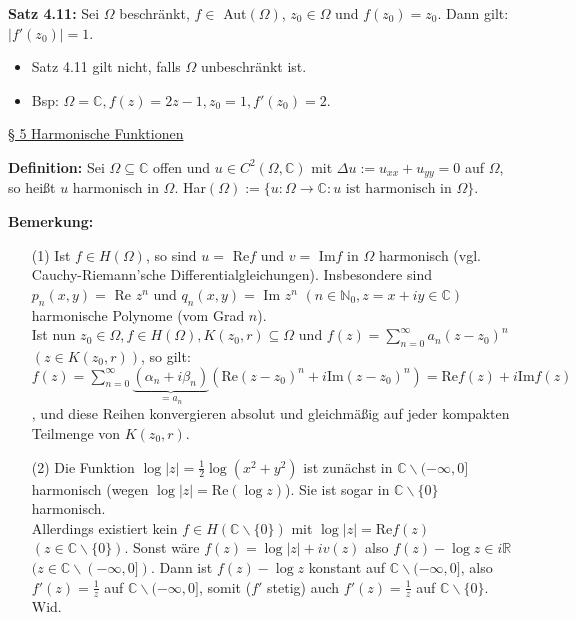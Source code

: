 \documentclass[11pt]{article}
\newcommand{\C}{\mathbb{C}}
\newcommand{\R}{\mathbb{R}}
\newcommand{\N}{\mathbb{N}}
\begin{document}
\textbf{Satz 4.11:} Sei $\Omega$ beschränkt, $f \in$ Aut$(\Omega)$, $z_0 \in \Omega$ und $f(z_0) = z_0$. Dann gilt: $|f'(z_0)| = 1$.
\vspace{-0.6cm}
\begin{itemize}
\item Satz 4.11 gilt nicht, falls $\Omega$ unbeschränkt ist. \vspace{-0.2cm}
\item Bsp: $\Omega = \C, f(z) = 2z-1, z_0 = 1, f'(z_0) = 2$.
\end{itemize}
\vspace{-0.3cm}

\underline{§ 5 Harmonische Funktionen}

\textbf{Definition:} Sei $\Omega \subseteq \C$ offen und $u \in C^2(\Omega, \C)$ mit $\Delta u := u_{xx} + u_{yy} = 0$ auf $\Omega$, so heißt $u$ harmonisch in $\Omega$. Har$(\Omega) := \{ u \colon \Omega \to \C \colon u \text{ ist harmonisch in } \Omega \}$.

\textbf{Bemerkung:} 
\vspace{-0.6cm}
\begin{itemize}
\item[(1)] Ist $f \in H(\Omega)$, so sind $u = $ Re$f$ und $v = $ Im$f$ in $\Omega$ harmonisch (vgl. Cauchy-Riemann'sche Differentialgleichungen). Insbesondere sind $p_n(x,y) =$ Re $z^n$ und $q_n(x,y) = $ Im $z^n$ $(n \in \N_0, z = x+iy \in \C)$ harmonische Polynome (vom Grad $n$). \\
Ist nun $z_0 \in \Omega, f \in H(\Omega), K(z_0,r) \subseteq \Omega$ und $f(z) = \sum_{n=0}^\infty a_n (z-z_0)^n$ $(z \in K(z_0, r))$, so gilt: $f(z) = \sum_{n=0}^\infty \underbrace{(\alpha_n + i\beta_n)}_{= a_n} (\text{Re}(z-z_0)^n + i\text{Im}(z-z_0)^n) = \text{Re}f(z) + i \text{Im}f(z)$, und diese Reihen konvergieren absolut und gleichmäßig auf jeder kompakten Teilmenge von $K(z_0, r)$.  \vspace{-0.2cm}
\item[(2)] Die Funktion $\log |z| = \frac{1}{2} \log(x^2 + y^2)$ ist zunächst in $\C \backslash (- \infty, 0]$ harmonisch (wegen $\log |z| = \text{Re}(\log z)$). Sie ist sogar in $\C \backslash \{ 0 \}$ harmonisch. \\
Allerdings existiert kein $f \in H(\C \backslash \{ 0 \})$ mit $\log |z| = \text{Re}f(z)$ $(z \in \C \backslash \{ 0 \})$. Sonst wäre $f(z) = \log |z| + iv(z)$ also $f(z)-\log z \in i\R$ $(z \in \C \backslash (-\infty,0])$. Dann ist $f(z) - \log z$ konstant auf $\C \backslash (-\infty,0]$, also $f'(z) = \frac{1}{z}$ auf $\C \backslash (-\infty,0]$, somit ($f'$ stetig) auch $f'(z) = \frac{1}{z}$ auf $\C \backslash \{ 0 \}$. Wid.
\end{itemize}
\vspace{-0.3cm}
\end{document}
